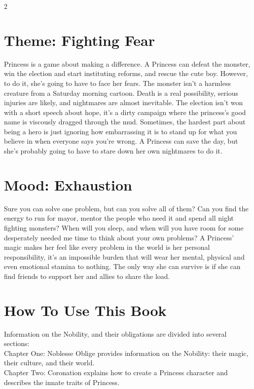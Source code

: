 \begin{multicols}{2}
\section*{Theme: Fighting Fear}

Princess is a game about making a difference. A Princess can defeat the monster, win the election and start instituting reforms, and rescue the cute boy. However, to do it, she’s going to have to face her fears. The monster isn’t a harmless creature from a Saturday morning cartoon. Death is a real possibility, serious injuries are likely, and nightmares are almost inevitable. The election isn’t won with a short speech about hope, it’s a dirty campaign where the princess's good name is viscously dragged through the mud. Sometimes, the hardest part about being a hero is just ignoring how embarrassing it is to stand up for what you believe in when everyone says you're wrong. A Princess can save the day, but she’s probably going to have to stare down her own nightmares to do it. 

\section*{Mood: Exhaustion}

Sure you can solve one problem, but can you solve all of them? Can you find the energy to run for mayor, mentor the people who need it and spend all night fighting monsters? When will you sleep, and when will you have room for some desperately needed me time to think about your own problems? A Princess’ magic makes her feel like every problem in the world is her personal responsibility, it’s an impossible burden that will wear her mental, physical and even emotional stamina to nothing. The only way she can survive is if she can find friends to support her and allies to share the load. 

\section*{How To Use This Book}

Information on the Nobility, and their obligations are divided into several sections:\\

\noindent Chapter One: Noblesse Oblige provides information on the Nobility: their magic, their culture, and their world. \\

\noindent Chapter Two: Coronation explains how to create a Princess character and describes the innate traits of  Princess.\\


\end{multicols}
